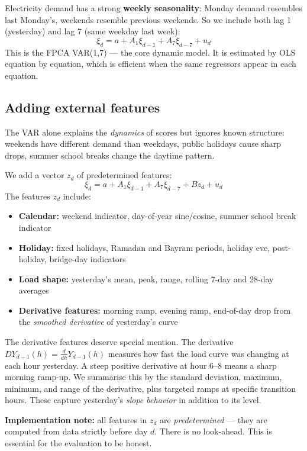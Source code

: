 \documentclass[11pt,a4paper]{article}
\begin{document}
Electricity demand has a strong \textbf{weekly seasonality}: Monday
demand resembles last Monday's, weekends resemble previous weekends.
So we include both lag 1 (yesterday) and lag 7 (same weekday last week):
\[
\xi_d = a + A_1\xi_{d-1} + A_7\xi_{d-7} + u_d
\]
This is the FPCA VAR(1,7) --- the core dynamic model. It is
estimated by OLS equation by equation, which is efficient when the
same regressors appear in each equation.

\subsection{Adding external features}

The VAR alone explains the \emph{dynamics} of scores but ignores
known structure: weekends have different demand than weekdays,
public holidays cause sharp drops,
summer school breaks change the daytime pattern.

We add a vector $z_d$ of predetermined features:
\[
\xi_d = a + A_1\xi_{d-1} + A_7\xi_{d-7} + Bz_d + u_d
\]
The features $z_d$ include:
\begin{itemize}[nosep]
  \item \textbf{Calendar:} weekend indicator, day-of-year sine/cosine,
    summer school break indicator
  \item \textbf{Holiday:} fixed holidays, Ramadan and Bayram periods,
    holiday eve, post-holiday, bridge-day indicators
  \item \textbf{Load shape:} yesterday's mean, peak, range, rolling
    7-day and 28-day averages
  \item \textbf{Derivative features:} morning ramp, evening ramp,
    end-of-day drop from the \emph{smoothed derivative} of yesterday's curve
\end{itemize}

The derivative features deserve special mention. The derivative
$DY_{d-1}(h) = \frac{d}{dh}Y_{d-1}(h)$ measures how fast the
load curve was changing at each hour yesterday. A steep positive
derivative at hour 6--8 means a sharp morning ramp-up. We summarise
this by the standard deviation, maximum, minimum, and range of the
derivative, plus targeted ramps at specific transition hours. These
capture yesterday's \emph{slope behavior} in addition to its level.

\begin{keybox}
\textbf{Implementation note:} all features in $z_d$ are
\emph{predetermined} --- they are computed from data strictly before
day $d$. There is no look-ahead. This is essential for the evaluation
to be honest.
\end{keybox}
\end{document}
